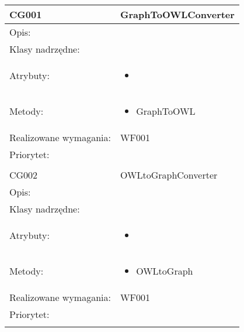 \documentclass[a4paper,10pt]{article}
\begin{document}
\begin{center}
 


\begin{longtable}{|m{3cm}|m{9cm}|} \hline

CG001 & GraphToOWLConverter \\ \hline
Opis: &     \\ \hline
Klasy nadrzędne: &     \\ \hline
Atrybuty: & \begin{itemize}
 \item 
\end{itemize}
 \\ \hline
Metody: & \begin{itemize}
 \item GraphToOWL
\end{itemize}
  \\ \hline
Realizowane wymagania: & WF001 \\ \hline
Priorytet: &  \\ \hline

\multicolumn{2}{c}{} \\
 \hline

CG002 & OWLtoGraphConverter \\ \hline
Opis: &     \\ \hline
Klasy nadrzędne: &     \\ \hline
Atrybuty: & \begin{itemize}
 \item 
\end{itemize}
 \\ \hline
Metody: & \begin{itemize}
 \item OWLtoGraph
\end{itemize}
  \\ \hline
Realizowane wymagania: & WF001 \\ \hline
Priorytet: &  \\ \hline

\multicolumn{2}{c}{} \\
 \hline


\end{longtable}

\end{center}


\clearpage
{}
{}

\end{document}
